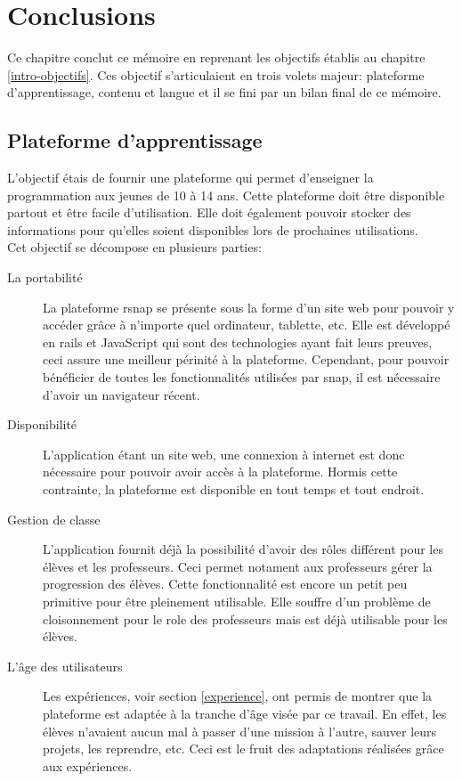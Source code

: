 \chapter{Conclusions}
Ce chapitre conclut ce mémoire en reprenant les objectifs établis au chapitre \ref{intro-objectifs}. Ces objectif s'articulaient en trois volets majeur: plateforme d'apprentissage, contenu et langue et il se fini par un bilan final de ce mémoire.
\section{Plateforme d'apprentissage}
L'objectif étais de fournir une plateforme qui permet d'enseigner la programmation aux jeunes de 10 à 14 ans. Cette plateforme doit être disponible partout et être facile d'utilisation. Elle doit également pouvoir stocker des informations pour qu'elles soient disponibles lors de prochaines utilisations.\\

Cet objectif se décompose en plusieurs parties:
\begin{description}
  \item[La portabilité] La plateforme \gls{rsnap} se présente sous la forme d'un site web \cite{rsnap} pour pouvoir y accéder grâce à n'importe quel ordinateur, tablette, etc. Elle est développé en \gls{rails} et JavaScript qui sont des technologies ayant fait leurs preuves, ceci assure une meilleur périnité à la plateforme. Cependant, pour pouvoir bénéficier de toutes les fonctionnalités utilisées par \gls{snap}, il est nécessaire d'avoir un navigateur récent.

  \item[Disponibilité] L'application étant un site web, une connexion à internet est donc nécessaire pour pouvoir avoir accès à la plateforme. Hormis cette contrainte, la plateforme est disponible en tout temps et tout endroit.

  \item[Gestion de classe] L'application fournit déjà la possibilité d'avoir des rôles différent pour les élèves et les professeurs. Ceci permet notament aux professeurs gérer la progression des élèves. Cette fonctionnalité est encore un petit peu primitive pour être pleinement utilisable. Elle souffre d'un problème de cloisonnement pour le \gls{role} des professeurs mais est déjà utilisable pour les élèves.

  \item[L'âge des utilisateurs] Les expériences, voir section \ref{experience}, ont permis de montrer que la plateforme est adaptée à la tranche d'âge visée par ce travail. En effet, les élèves n'avaient aucun mal à passer d'une \gls{mission} à l'autre, sauver leurs projets, les reprendre, etc. Ceci est le fruit des adaptations réalisées grâce aux expériences.
\end{description}

